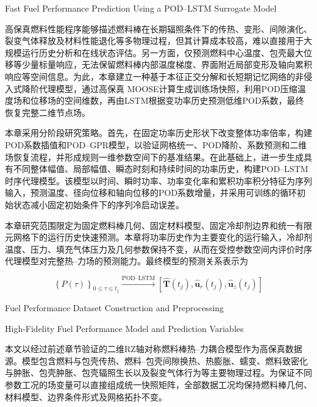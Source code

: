 
{Fast Fuel Performance Prediction Using a POD--LSTM Surrogate Model}

高保真燃料性能程序能够描述燃料棒在长期辐照条件下的传热、变形、间隙演化、裂变气体释放及材料性能退化等多物理过程，但其计算成本较高，难以直接用于大规模运行历史分析和在线状态评估。另一方面，仅预测燃料中心温度、包壳最大位移等少量标量响应，无法保留燃料棒内部温度梯度、界面附近局部变形及轴向累积响应等空间信息。为此，本章建立一种基于本征正交分解和长短期记忆网络的非侵入式降阶代理模型，通过高保真
MOOSE计算生成训练场快照，利用POD压缩温度场和位移场的空间维数，再由LSTM根据变功率历史预测低维POD系数，最终恢复完整二维节点场。

本章采用分阶段研究策略。首先，在固定功率历史形状下改变整体功率倍率，构建POD系数插值和POD--GPR模型，以验证网格统一、POD降阶、系数预测和二维场恢复流程，并形成规则一维参数空间下的基准结果。在此基础上，进一步生成具有不同整体幅值、局部幅值、瞬态时刻和持续时间的功率历史，构建POD--LSTM时序代理模型。该模型以时间、瞬时功率、功率变化率和累积功率积分特征为序列输入，预测温度、径向位移和轴向位移的POD系数增量，并采用可训练的循环初始状态减小固定初始条件下的序列冷启动误差。

本章研究范围限定为固定燃料棒几何、固定材料模型、固定冷却剂边界和统一有限元网格下的运行历史快速预测。本章将功率历史作为主要变化的运行输入，冷却剂温度、压力、填充气体压力及几何参数保持不变，从而在受控参数空间内评价时序代理模型对完整热--力场的预测能力。最终模型的预测关系表示为

\begin{equation}
	\left\{P(\tau)\right\}_{0\leq\tau\leq t_j}
	\xrightarrow{\mathrm{POD\text{--}LSTM}}
	\left[
	\widehat{\boldsymbol T}(t_j),
	\widehat{\boldsymbol u}_r(t_j),
	\widehat{\boldsymbol u}_z(t_j)
	\right]
	\label{eq:ch6_final_mapping}
\end{equation}

{Fuel Performance Dataset Construction and Preprocessing}

{High-Fidelity Fuel Performance Model and Prediction Variables}

本文以经过前述章节验证的二维RZ轴对称燃料棒热--力耦合模型作为高保真数据源。模型包含燃料与包壳传热、燃料--包壳间隙换热、热膨胀、蠕变、燃料致密化与肿胀、包壳肿胀、包壳辐照生长以及裂变气体行为等主要物理过程。为保证不同参数工况的场变量可以直接组成统一快照矩阵，全部数据工况均保持燃料棒几何、材料模型、边界条件形式及网格拓扑不变。

